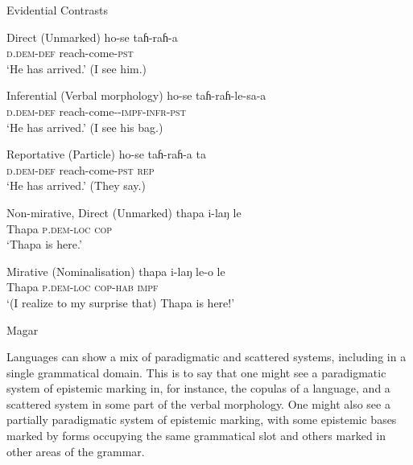 \begin{exe}
        \ex Evidential Contrasts\label{e:Description:MagarScattered}
        \begin{xlist}
          \ex Direct (Unmarked)
          \gll ho-se taɦ-raɦ-a \\
          \textsc{d.dem-def} reach-come-\textsc{pst} \\
          \glt `He has arrived.' (I see him.)
      
          \ex Inferential (Verbal morphology)
          \gll ho-se taɦ-raɦ-le-sa-a \\
          \textsc{d.dem-def} reach-come-\textsc{-impf-infr-pst} \\
          \glt `He has arrived.' (I see his bag.)
      
          \ex Reportative (Particle)
          \gll ho-se taɦ-raɦ-a ta \\
          \textsc{d.dem-def} reach-come-\textsc{pst} \textsc{rep} \\
          \glt `He has arrived.' (They say.)

          \ex Non-mirative, Direct (Unmarked) \label{e:Description:MagarScattered:d}
          \gll thapa i-laŋ le \\
          Thapa \textsc{p.dem-loc} \textsc{cop} \\
          \glt `Thapa is here.'
      
          \ex Mirative (Nominalisation)\label{e:Description:MagarScattered:e}
          \gll thapa i-laŋ le-o le \\
          Thapa \textsc{p.dem-loc} \textsc{cop-hab} \textsc{impf} \\
          \glt `(I realize to my surprise that) Thapa is here!' 
        \end{xlist}
        Magar \cite[Magaric: Nepal,][480, 497]{GrunowHarsta2008}
      \end{exe}

Languages can show a mix of paradigmatic and scattered systems, including in a single grammatical domain. This is to say that one might see a paradigmatic system of epistemic marking in, for instance, the copulas of a language, and a scattered system in some part of the verbal morphology. One might also see a partially paradigmatic system of epistemic marking, with some epistemic bases marked by forms occupying the same grammatical slot and others marked in other areas of the grammar.

